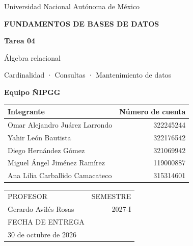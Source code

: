 \hypersetup{pageanchor=false}
\begin{titlepage}
\thispagestyle{empty}
{\color{white}\sffamily
{\large Universidad Nacional Autónoma de México\par}
\vspace{2pt}{\normalsize Facultad de Ciencias\par}
\vspace{.85cm}
{\small\bfseries\color{Oro}FUNDAMENTOS DE BASES DE DATOS\par}
\vspace{.35cm}
{\fontsize{38}{42}\selectfont\bfseries Tarea 04\par}
\vspace{.2cm}
{\fontsize{25}{30}\selectfont Álgebra relacional\par}
\vspace{.45cm}
{\small Cardinalidad · Consultas · Mantenimiento de datos\par}}
\vspace{1.9cm}
{\sffamily\color{Azul}\Large\bfseries Equipo ÑIPGG\par}
\vspace{.35cm}
{\sffamily\small
\renewcommand{\arraystretch}{1.65}
\begin{tabularx}{\linewidth}{@{}Xr@{}}
\toprule
\textbf{Integrante} & \textbf{Número de cuenta}\\\midrule
Omar Alejandro Juárez Larrondo & 322245244\\
Yahir León Bautista & 322176542\\
Diego Hernández Gómez & 321069942\\
Miguel Ángel Jiménez Ramírez & 119000887\\
Ana Lilia Carballido Camacateco & 315314601\\
\bottomrule
\end{tabularx}\par}
\vfill
{\sffamily\small
\begin{tabularx}{\linewidth}{@{}Xr@{}}
\textcolor{Gris}{PROFESOR} & \textcolor{Gris}{SEMESTRE}\\[3pt]
Gerardo Avilés Rosas & 2027-I\\[12pt]
\textcolor{Gris}{FECHA DE ENTREGA} &\\[3pt]
30 de octubre de 2026 &\\
\end{tabularx}\par}
\vspace{.35cm}{\color{Oro}\rule{\linewidth}{.7pt}}
\end{titlepage}
\hypersetup{pageanchor=true}
\setcounter{page}{1}
